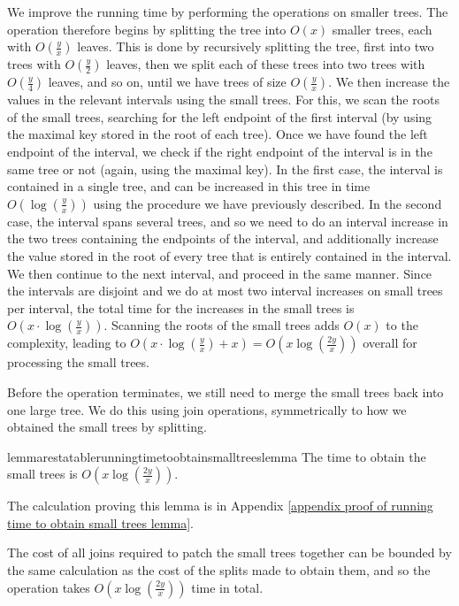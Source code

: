 \documentclass[a4paper,UKenglish]{lipics-v2016}
\theoremstyle{plain}
\begin{document}
We improve the running time by performing the operations on smaller trees. The operation therefore begins by splitting the tree into $O(x)$ smaller trees, each with $O(\frac{y}{x})$ leaves. This is done by recursively splitting the tree, first into two trees with $O(\frac{y}{2})$ leaves, then we split each of these trees into two trees with $O(\frac{y}{4})$ leaves, and so on, until we have trees of size $O(\frac{y}{x})$. We then increase the values in the relevant intervals using the small trees. For this, we scan the roots of the small trees, searching for the left endpoint of the first interval (by using the maximal key stored in the root of each tree). Once we have found the left endpoint of the interval, we check if the right endpoint of the interval is in the same tree or not (again, using the maximal key). In the first case, the interval is contained in a single tree, and can be increased in this tree in time $O(\log(\frac{y}{x}))$ using the procedure we have previously described. In the second case, the interval spans several trees, and so we need to do an interval increase in the two trees containing the endpoints of the interval, and additionally increase the value stored in the root of every tree that is entirely contained in the interval. We then continue to the next interval, and proceed in the same manner. 
%
Since the intervals are disjoint and we do at most two interval increases on small trees per interval, the total time for the increases in the small trees is $O(x \cdot \log (\frac{y}{x}))$. Scanning the roots of the small trees adds $O(x)$ to the complexity, leading to 
 $O(x \cdot \log (\frac{y}{x}) + x) = O(x \log (\frac{2y}{x}))$ overall for processing the small trees.

Before the operation terminates, we still need to merge the small trees back into one large tree. We do this using join operations, symmetrically to how we obtained the small trees by splitting. 

\begin{restatable}{lemmarestatable}{runningtimetoobtainsmalltreeslemma}
\label{running time to obtain small trees lemma}
The time to obtain the small trees is $O(x \log (\frac{2y}{x}))$.
\end{restatable}
The calculation proving this lemma is in Appendix \ref{appendix proof of running time to obtain small trees lemma}.

The cost of all joins required to patch the small trees together can be bounded by the same calculation as the cost of the splits made to obtain them, and so the operation takes $O(x \log (\frac{2y}{x}))$ time in total.
\end{document}
